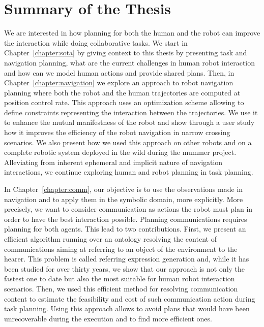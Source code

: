 \documentclass[a4paper,11pt,twoside]{StyleThese}
\begin{document}
\section*{Summary of the Thesis}
We are interested in how planning for both the human and the robot can improve the interaction while doing collaborative tasks. We start in Chapter~\ref{chapter:sota} by giving context to this thesis by presenting task and navigation planning, what are the current challenges in human robot interaction and how can we model human actions and provide shared plans. Then, in Chapter~\ref{chapter:navigation} we explore an approach to robot navigation planning where both the robot and the human trajectories are computed at position control rate. This approach uses an optimization scheme allowing to define constraints representing the interaction between the trajectories. We use it to enhance the mutual manifestness of the robot and show through a user study how it improves the efficiency of the robot navigation in narrow crossing scenarios. We also present how we used this approach on other robots and on a complete robotic system deployed in the wild during the \acrfull{mummer} project. Alleviating from inherent ephemeral and implicit nature of navigation interactions, we continue exploring human and robot planning in task planning.

In Chapter~\ref{chapter:comm}, our objective is to use the observations made in navigation and to apply them in the symbolic domain, more explicitly. More precisely, we want to consider communication as actions the robot must plan in order to have the best interaction possible. Planning communications requires planning for both agents. This lead to two contributions. First, we present an efficient algorithm running over an ontology resolving the content of communications aiming at referring to an object of the environment to the hearer. This problem is called referring expression generation and, while it has been studied for over thirty years, we show that our approach is not only the fastest one to date but also the most suitable for human robot interaction scenarios. Then, we used this efficient method for resolving communication content to estimate the feasibility and cost of such communication action during task planning. Using this approach allows to avoid plans that would have been unrecoverable during the execution and to find more efficient ones.
\end{document}
